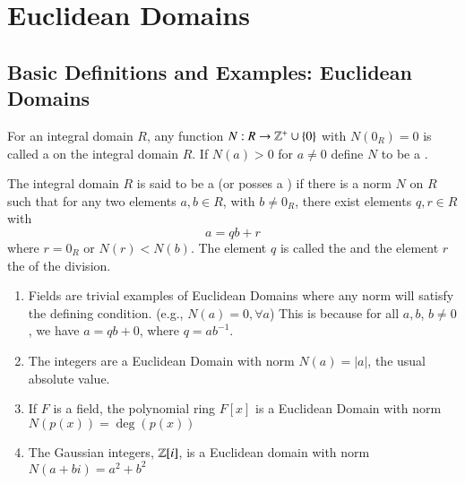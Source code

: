 \chapter{\textsection\textsection Euclidean Domains}

\section{\textsection Basic Definitions and Examples: Euclidean Domains}

\begin{defn}[Norm]
    For an integral domain $R$, any function $N:R\rightarrow \mathbb Z^+\cup\{0\}$ with $N(0_R) = 0$ is called a  on the integral domain $R$. If $N(a) > 0$ for $a \neq 0$ define $N$ to be a .
\end{defn}

\begin{defn}
    The integral domain $R$ is said to be a  (or posses a ) if there is a norm $N$ on $R$ such that for any two elements $a,b \in R$, with $b \neq 0_R$, there exist elements $q,r \in R$ with $$a= qb+r$$ where $r = 0_R$ or $N(r) < N(b)$. The element $q$ is called the  and the element $r$ the  of the division.
\end{defn}

\begin{eg}
    \leavevmode
    \begin{enumerate}
        \item Fields are trivial examples of Euclidean Domains where any norm will satisfy the defining condition. (e.g., $N(a) = 0,\forall a$) This is because for all $a,b$, $b\neq 0$, we have $a = qb+0$, where $q = ab^{-1}$.
        \item The integers are a Euclidean Domain with norm $N(a) = |a|$, the usual absolute value.
        \item If $F$ is a field, the polynomial ring $F[x]$ is a Euclidean Domain with norm $N(p(x)) = \deg(p(x))$
        \item The Gaussian integers, $\mathbb Z[i]$, is a Euclidean domain with norm $N(a+bi) = a^2+b^2$
    \end{enumerate}
\end{eg}


